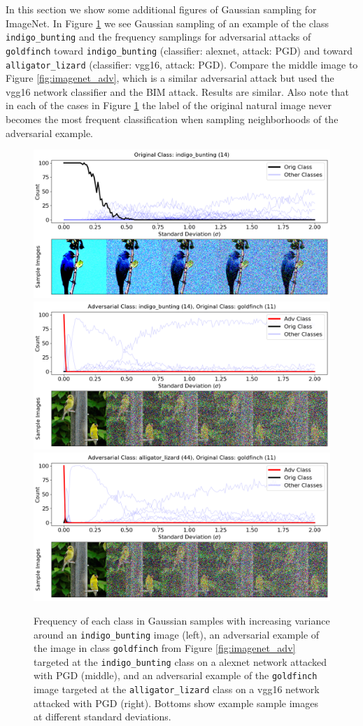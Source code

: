 In this section we show some additional figures of Gaussian sampling for ImageNet. In Figure \ref{fig:moreimagenet} we see Gaussian sampling of an example of the class \texttt{indigo\_bunting} and the frequency samplings for adversarial attacks of \texttt{goldfinch} toward \texttt{indigo\_bunting} (classifier: alexnet, attack: PGD) and  toward  \texttt{alligator\_lizard} (classifier: vgg16, attack: PGD). Compare the middle image to Figure \ref{fig:imagenet_adv}, which is a similar adversarial attack but used the vgg16 network classifier and the BIM attack. Results are similar. Also note that in each of the cases in Figure \ref{fig:moreimagenet} the label of the original natural image never becomes the most frequent classification when sampling neighborhoods of the adversarial example. 

\begin{figure}[!htb]
    \centering
    \includegraphics[width=.32\textwidth]{c2_figures/ILSVRC2012_val_00000414-vgg16-sampling.png}
    \includegraphics[width=.32\textwidth]{c2_figures/IMNET-class-11-alexnet-PGD-48-attack_data-023.png}
    \includegraphics[width=.32\textwidth]{c2_figures/IMNET-class-11-vgg16-PGD-48-attack_data-039.png}
    \caption{Frequency of each class in Gaussian samples with increasing variance around an \texttt{indigo\_bunting} image (left), an adversarial example of the image in class \texttt{goldfinch} from Figure \ref{fig:imagenet_adv} targeted at the \texttt{indigo\_bunting} class on a alexnet network attacked with PGD (middle), and an adversarial example of the \texttt{goldfinch} image targeted at the \texttt{alligator\_lizard} class on a vgg16 network attacked with PGD (right). Bottoms show example sample images at different standard deviations.}
    \label{fig:moreimagenet}
\end{figure}


